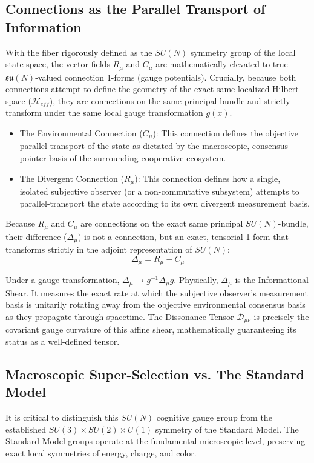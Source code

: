 \documentclass[12pt,openany]{book}
\theoremstyle{plain}
\theoremstyle{definition}
\theoremstyle{remark}
\begin{document}
\subsection{Connections as the Parallel Transport of Information}

With the fiber rigorously defined as the $SU(N)$ symmetry group of the local state space, the vector fields $R_\mu$ and $C_\mu$ are mathematically elevated to true $\mathfrak{su}(N)$-valued connection 1-forms (gauge potentials). Crucially, because both connections attempt to define the geometry of the exact same localized Hilbert space ($\mathcal{H}_{eff}$), they are connections on the same principal bundle and strictly transform under the same local gauge transformation $g(x)$.

\begin{itemize}
	\item The Environmental Connection ($C_\mu$): This connection defines the objective parallel transport of the state as dictated by the macroscopic, consensus pointer basis of the surrounding cooperative ecosystem.
	\item The Divergent Connection ($R_\mu$): This connection defines how a single, isolated subjective observer (or a non-commutative subsystem) attempts to parallel-transport the state according to its own divergent measurement basis.
\end{itemize}

Because $R_\mu$ and $C_\mu$ are connections on the exact same principal $SU(N)$-bundle, their difference ($\Delta_\mu$) is not a connection, but an exact, tensorial 1-form that transforms strictly in the adjoint representation of $SU(N)$:$$\Delta_\mu = R_\mu - C_\mu$$

Under a gauge transformation, $\Delta_\mu \to g^{-1} \Delta_\mu g$. Physically, $\Delta_\mu$ is the Informational Shear. It measures the exact rate at which the subjective observer's measurement basis is unitarily rotating away from the objective environmental consensus basis as they propagate through spacetime. The Dissonance Tensor $\mathcal{D}_{\mu\nu}$ is precisely the covariant gauge curvature of this affine shear, mathematically guaranteeing its status as a well-defined tensor.

\subsection{Macroscopic Super-Selection vs. The Standard Model}

It is critical to distinguish this $SU(N)$ cognitive gauge group from the established $SU(3) \times SU(2) \times U(1)$ symmetry of the Standard Model. The Standard Model groups operate at the fundamental microscopic level, preserving exact local symmetries of energy, charge, and color. 
\end{document}
